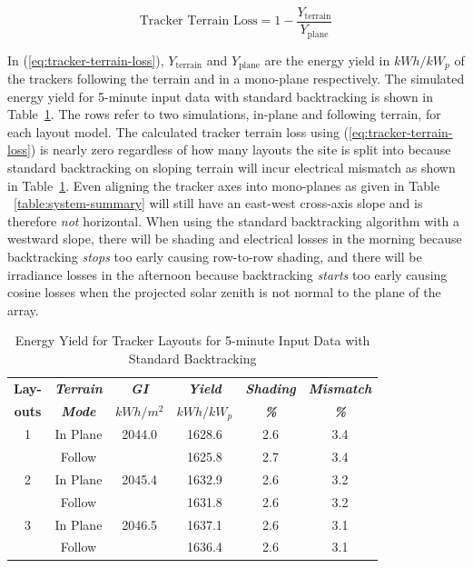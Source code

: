 \documentclass[conference]{IEEEtran}
\begin{document}
\begin{equation}
\text{Tracker Terrain Loss} = 1 - \frac{Y_\text{terrain}}{Y_\text{plane}}\label{eq:tracker-terrain-loss}
\end{equation}

In (\ref{eq:tracker-terrain-loss}), $Y_\text{terrain}$ and $Y_\text{plane}$ are the energy yield in $kWh/kW_p$ of the trackers following the terrain and in a mono-plane respectively. The simulated energy yield for 5-minute input data with standard backtracking is shown in Table~\ref{table:standard-5min}. The rows refer to two simulations, in-plane and following terrain, for each layout model. The calculated tracker terrain loss using (\ref{eq:tracker-terrain-loss}) is nearly zero regardless of how many layouts the site is split into because standard backtracking on sloping terrain will incur electrical mismatch as shown in Table~\ref{table:standard-5min}. Even aligning the tracker axes into mono-planes as given in Table ~\ref{table:system-summary} will still have an east-west cross-axis slope and is therefore \textit{not} horizontal. When using the standard backtracking algorithm with a westward slope, there will be shading and electrical losses in the morning because backtracking \textit{stops} too early causing row-to-row shading, and there will be irradiance losses in the afternoon because backtracking \textit{starts} too early causing cosine losses when the projected solar zenith is not normal to the plane of the array.

\begin{table}[htbp]
\caption{Energy Yield for Tracker Layouts for 5-minute Input Data with Standard Backtracking}
\begin{center}
\begin{tabular}{|c|c|c|c|c|c|}
\hline
\textbf{Lay-}& \textbf{\textit{Terrain}}& \textbf{\textit{GI}}&        \textbf{\textit{Yield}}&        \textbf{\textit{Shading}}& \textbf{\textit{Mismatch}} \\
\textbf{outs}& \textbf{\textit{Mode}}&    \textbf{\textit{$kWh/m^2$}}& \textbf{\textit{$kWh / kW_p$}}& \textbf{\textit{\%}}&      \textbf{\textit{\%}} \\
\hline
1& In Plane& 2044.0&  1628.6& 2.6& 3.4 \\
 & Follow&         &  1625.8& 2.7& 3.4 \\
\hline
2& In Plane& 2045.4&  1632.9& 2.6& 3.2 \\
 & Follow&         &  1631.8& 2.6& 3.2 \\
\hline
3& In Plane& 2046.5&  1637.1& 2.6& 3.1 \\
 & Follow&         &  1636.4& 2.6& 3.1 \\
\hline
\end{tabular}
\label{table:standard-5min}
\end{center}
\end{table}
\end{document}
